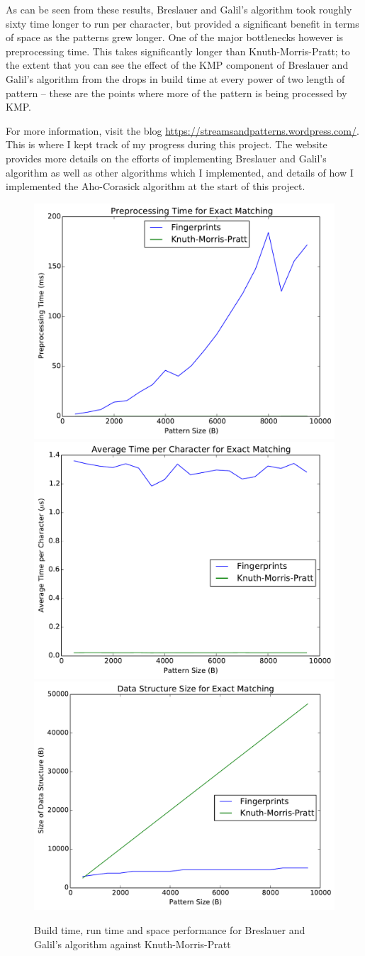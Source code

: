 \documentclass[ %
                    author={Dominic Joseph Moylett},
                    degree={MEng},
                     title={Dictionary Matching with Fingerprints},
                  subtitle={An Empirical Analysis},
                      type={research},
                      year={2015} ]{dissertation}
\begin{document}
As can be seen from these results, Breslauer and Galil's algorithm took roughly sixty time longer to run per character, but provided a significant benefit in terms of space as the patterns grew longer. One of the major bottlenecks however is preprocessing time. This takes significantly longer than Knuth-Morris-Pratt; to the extent that you can see the effect of the KMP component of Breslauer and Galil's algorithm from the drops in build time at every power of two length of pattern -- these are the points where more of the pattern is being processed by KMP.

For more information, visit the blog \url{https://streamsandpatterns.wordpress.com/}. This is where I kept track of my progress during this project. The website provides more details on the efforts of implementing Breslauer and Galil's algorithm as well as other algorithms which I implemented, and details of how I implemented the Aho-Corasick algorithm at the start of this project.

\begin{figure}[t]
\begin{center}
  \includegraphics[width=0.5\linewidth]{summer_build_time}\\
  \includegraphics[width=0.5\linewidth]{summer_run_time}\includegraphics[width=0.5\linewidth]{summer_size}
\end{center}
\caption{Build time, run time and space performance for Breslauer and Galil's algorithm against Knuth-Morris-Pratt}
\label{fig:summer-results}
\end{figure}
\end{document}

